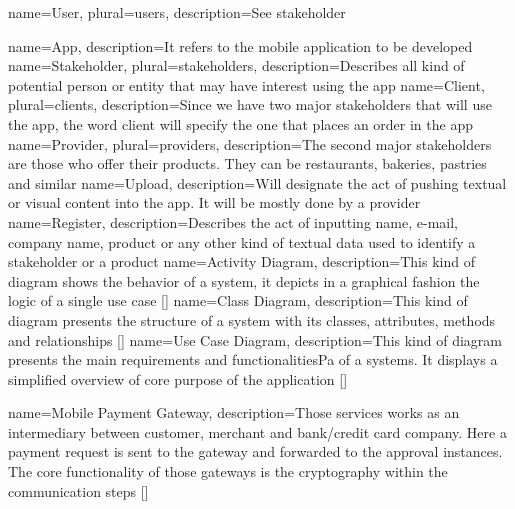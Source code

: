 
 {
    name={User},
    plural={users},
    description={See stakeholder}
}

 {
    name={App},
    description={It refers to the mobile application to be developed}
}
 {
    name={Stakeholder},
    plural={stakeholders},
    description={Describes all kind of potential person or entity that may have interest using the app}
}
 {
    name={Client},
    plural={clients},
    description={Since we have two major stakeholders that will use the app, the word client will
    specify the one that places an order in the app}
}
 {
    name={Provider},
    plural={providers},
    description={The second major stakeholders are those who offer their products. They can be
                restaurants, bakeries, pastries and similar}
}
 {
    name={Upload},
    description={Will designate the act of pushing textual or visual content into the app. It will
                be mostly done by a provider}
}
 {
    name={Register},
    description={Describes the act of inputting name, e-mail, company name, product or any other kind of
    textual data used to identify a stakeholder or a product}
}
 {
    name={Activity Diagram},
    description={This kind of diagram shows the behavior of a system, it depicts in a graphical fashion 
    the logic of a single use case [\cite{refinbook:Baresi2009}]}
}
 {
    name={Class Diagram},
    description={This kind of diagram presents the structure of a system with its classes, attributes,
    methods and relationships [\cite{refonline:IBMCD}]}
}
 {
    name={Use Case Diagram},
    description={This kind of diagram presents the main requirements and functionalitiesPa of a systems. It displays
    a simplified overview of core purpose of the application [\cite{refart:YWRUS}]}
}

 {
    name={Mobile Payment Gateway},
    description={Those services works as an intermediary between customer, merchant and bank/credit card company. 
    Here a payment request is sent to the gateway and forwarded to the approval instances. The core functionality 
    of those gateways is the cryptography within the communication steps [\cite{refonline:VPGI}]}
}

